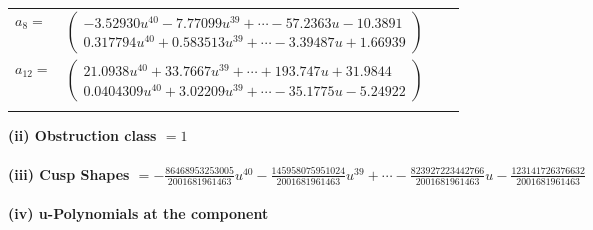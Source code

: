 \documentclass[1p]{elsarticle_modified}
\theoremstyle{definition}
\begin{document}
\begin{tabular}{m{7pt} m{180pt} m{7pt} m{180pt} }
\flushright $a_{8}=$&$\begin{pmatrix}-3.52930 u^{40}-7.77099 u^{39}+\cdots-57.2363 u-10.3891\\0.317794 u^{40}+0.583513 u^{39}+\cdots-3.39487 u+1.66939\end{pmatrix}$ \\
\flushright $a_{12}=$&$\begin{pmatrix}21.0938 u^{40}+33.7667 u^{39}+\cdots+193.747 u+31.9844\\0.0404309 u^{40}+3.02209 u^{39}+\cdots-35.1775 u-5.24922\end{pmatrix}$\\&\end{tabular}
\flushleft \textbf{(ii) Obstruction class $= 1$}\\~\\
\flushleft \textbf{(iii) Cusp Shapes $= -\frac{86468953253005}{2001681961463} u^{40}-\frac{145958075951024}{2001681961463} u^{39}+\cdots-\frac{823927223442766}{2001681961463} u-\frac{123141726376632}{2001681961463}$}\\~\\
\newpage\renewcommand{\arraystretch}{1}
\flushleft \textbf{(iv) u-Polynomials at the component}\newline \\
\end{document}
